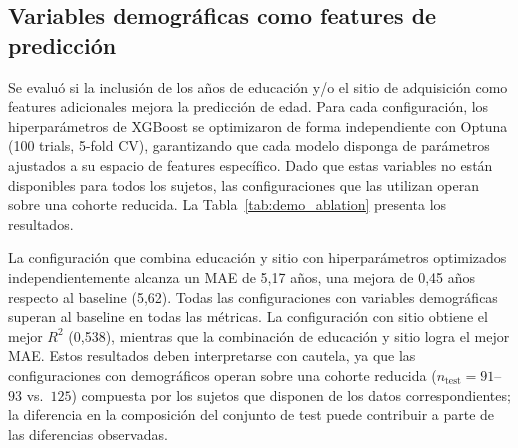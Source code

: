 \subsection{Variables demográficas como features de predicción}
\label{sec:res_demo_ablacion}

Se evaluó si la inclusión de los años de educación y/o el sitio de adquisición como features adicionales mejora la predicción de edad. Para cada configuración, los hiperparámetros de XGBoost se optimizaron de forma independiente con Optuna (100 trials, 5-fold CV), garantizando que cada modelo disponga de parámetros ajustados a su espacio de features específico. Dado que estas variables no están disponibles para todos los sujetos, las configuraciones que las utilizan operan sobre una cohorte reducida. La Tabla~\ref{tab:demo_ablation} presenta los resultados.

\begin{table}[H]
\centering
\caption{Ablaciones con variables demográficas como features adicionales, cada una con hiperparámetros de XGBoost optimizados independientemente con Optuna. La reducción de $N$ se debe a la disponibilidad parcial de educación y sitio ($\sim$75\% de la cohorte). Se resalta en negrita la configuración con mejor MAE.}
\label{tab:demo_ablation}
\end{table}

La configuración que combina educación y sitio con hiperparámetros optimizados independientemente alcanza un MAE de 5,17 años, una mejora de 0,45 años respecto al baseline (5,62). Todas las configuraciones con variables demográficas superan al baseline en todas las métricas. La configuración con sitio obtiene el mejor $R^2$ (0,538), mientras que la combinación de educación y sitio logra el mejor MAE. Estos resultados deben interpretarse con cautela, ya que las configuraciones con demográficos operan sobre una cohorte reducida ($n_{\text{test}} = 91$--$93$ vs.~$125$) compuesta por los sujetos que disponen de los datos correspondientes; la diferencia en la composición del conjunto de test puede contribuir a parte de las diferencias observadas.

